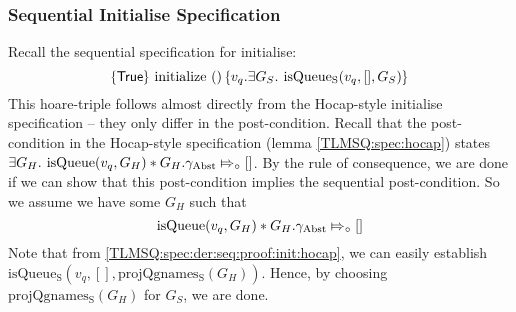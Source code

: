 \documentclass[a4paper, 10pt]{report}
\theoremstyle{definition}
\newcommand{\initialise}{\operatorname{initialize}}
\newcommand{\isqueue}{\operatorname{isQueue}}
\newcommand{\isqueueseq}{\operatorname{isQueue_{S}}}
\newcommand{\vq}{v_q}
\newcommand{\projqgnamesseq}{\operatorname{projQgnames_{S}}}
\newcommand{\Qgseq}{G_{S}}
\newcommand{\Qghocap}{G_{H}}
\newcommand{\gabst}{\gname_{\mathrm{Abst}}}
\newcommand{\abstractstatefullfrag}[2]{#1 \Mapsto_{\circ} #2}
\newcommand{\tlseqspecinitHTGen}[2]{\hoare{\TRUE}{\initialise \ \TT}{#1 . \Exists #2. \isqueueseq(#1, [], #2)}}
\newcommand{\tlseqspecinitGen}[2]{\tlseqspecinitHTGen{#1}{#2}}
\begin{document}
\subsubsection{Sequential Initialise Specification}
Recall the sequential specification for initialise:
\begin{equation*}
  \tlseqspecinitGen{\vq}{\Qgseq}
\end{equation*}
This hoare-triple follows almost directly from the Hocap-style initialise specification -- they only differ in the post-condition. Recall that the post-condition in the Hocap-style specification (lemma \ref{TLMSQ:spec:hocap}) states $\Exists \Qghocap . \isqueue(\vq, \Qghocap) \star{} \abstractstatefullfrag{\Qghocap.\gabst}{[]}$. By the rule of consequence, we are done if we can show that this post-condition implies the sequential post-condition. So we assume we have some $\Qghocap$ such that 
\begin{equation}
  \isqueue(\vq, \Qghocap) \star{} \abstractstatefullfrag{\Qghocap.\gabst}{[]}\label{TLMSQ:spec:der:seq:proof:init:hocap}
\end{equation}
Note that from \ref{TLMSQ:spec:der:seq:proof:init:hocap}, we can easily establish $\isqueueseq(\vq, [], \projqgnamesseq(\Qghocap))$. Hence, by choosing $\projqgnamesseq(\Qghocap)$ for $\Qgseq$, we are done.
\end{document}
